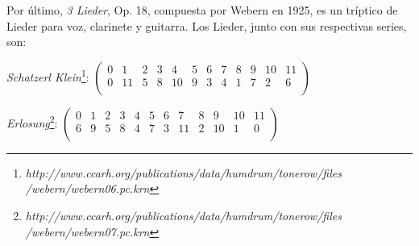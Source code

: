         Por último, \textit{3 Lieder}, Op. 18, compuesta por Webern en 1925, es un tríptico de Lieder para voz, clarinete y guitarra. Los Lieder, junto con sus respectivas series, son:
        
        \textit{Schatzerl Klein}\footnote{\textit{http://www.ccarh.org/publications/data/humdrum/tonerow/files\\/webern/webern06.pc.krn}}: \hfill
       	$\left(\begin{matrix}0&1&2&3&4&5&6&7&8&9&10&11\\0&11&5&8&10&9&3&4&1&7&2&6\\\end{matrix}\right)$
        
        \textit{Erlosung}\footnote{\textit{http://www.ccarh.org/publications/data/humdrum/tonerow/files\\/webern/webern07.pc.krn}}: \hfill
       	$\left(\begin{matrix}0&1&2&3&4&5&6&7&8&9&10&11\\6&9&5&8&4&7&3&11&2&10&1&0\\\end{matrix}\right)$
    	
